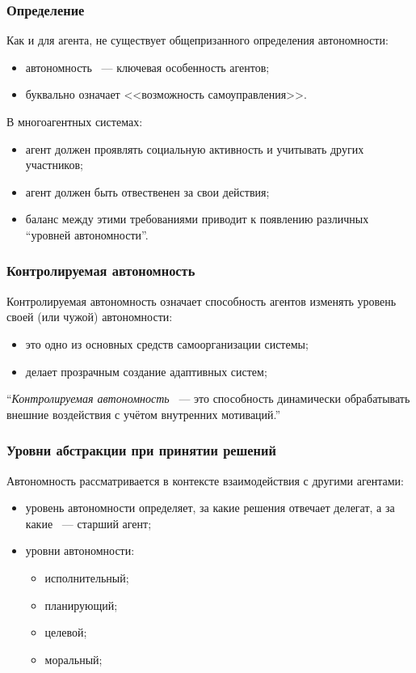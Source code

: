\documentclass{beamer}
\begin{document}
\begin{frame}
  \frametitle{Определение}
  Как и для агента, не существует общепризанного определения автономности:
  \begin{itemize}
    \item автономность ~--- ключевая особенность агентов;
    \item буквально означает <<возможность самоуправления>>.
  \end{itemize}

  В многоагентных системах:
  \begin{itemize}
    \item агент должен проявлять социальную активность и учитывать других участников;
    \item агент должен быть отвественен за свои действия;
    \item баланс между этими требованиями приводит к появлению различных ``уровней автономности''.
  \end{itemize}
\end{frame}

\begin{frame}
  \frametitle{Контролируемая автономность}
  Контролируемая автономность означает способность агентов изменять
  уровень своей (или чужой) автономности:
  \begin{itemize}
    \item это одно из основных средств самоорганизации системы;
    \item делает прозрачным создание адаптивных систем;
  \end{itemize}

  \begin{exampleblock}{}
    {\large ``{\it Контролируемая автономность} ~--- это способность динамически
    обрабатывать внешние воздействия с учётом внутренних мотиваций.''}
    \vskip5mm
    \hspace*{}
  \end{exampleblock}
\end{frame}

\begin{frame}
  \frametitle{Уровни абстракции при принятии решений}
  Автономность рассматривается в контексте взаимодействия с другими агентами:
  \begin{itemize}
    \item уровень автономности определяет, за какие решения отвечает делегат, а за какие ~--- старший агент;
    \item уровни автономности:
      \begin{itemize}
        \item исполнительный;
        \item планирующий;
        \item целевой;
        \item моральный;
      \end{itemize}
  \end{itemize}
\end{frame}
\end{document}
